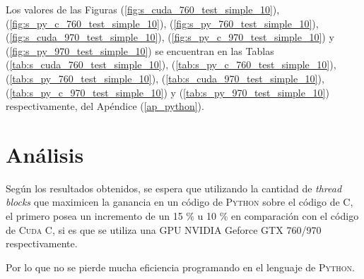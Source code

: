 Los valores de las Figuras (\ref{fig:s_cuda_760_test_simple_10}), (\ref{fig:s_py_c_760_test_simple_10}), (\ref{fig:s_py_760_test_simple_10}), (\ref{fig:s_cuda_970_test_simple_10}), (\ref{fig:s_py_c_970_test_simple_10}) y (\ref{fig:s_py_970_test_simple_10}) se encuentran en las Tablas (\ref{tab:s_cuda_760_test_simple_10}), (\ref{tab:s_py_c_760_test_simple_10}), (\ref{tab:s_py_760_test_simple_10}), (\ref{tab:s_cuda_970_test_simple_10}), (\ref{tab:s_py_c_970_test_simple_10}) y (\ref{tab:s_py_970_test_simple_10}) respectivamente, del Apéndice (\ref{ap_python}).
\section{Análisis}

Según los resultados obtenidos, se espera que utilizando la cantidad de \textit{thread blocks} que maximicen la ganancia en un código de \textsc{Python} sobre el código de \textsc{C}, el primero posea un incremento de un  15 \%  u 10 \% en comparación con el código de \textsc{Cuda C}, si es que se utiliza una GPU NVIDIA Geforce GTX 760/970 respectivamente.

Por lo que no se pierde mucha eficiencia programando en el lenguaje de \textsc{Python}.




